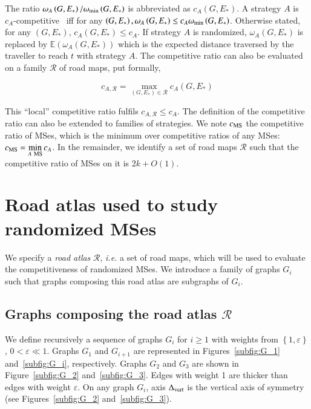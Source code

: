 \documentclass[preprint]{elsarticle}
\newcommand{\set}[1]{\left\{ #1 \right\}}
\newcommand{\omegamin}{\omega_{\mbox{\scriptsize{min}}}}
\newcommand{\mcalr}{\mathcal{R}}
\newcommand{\mts}{MS}
\newcommand{\deltavert}{\Delta_{\mbox{\scriptsize{vert}}}}
\newcommand{\cms}{c_{\mbox{\scriptsize{MS}}}}
\begin{document}
The ratio $\omega_A\left(G,E_*\right)/\omegamin\left(G,E_*\right)$ is abbreviated as $c_A\left(G,E_*\right)$. A strategy $A$ is $c_A$-competitive~\cite{BoEl98,XuHuSuZh09} iff for any $\left(G,E_*\right), \omega_A\left(G,E_*\right) \leq c_A \omegamin\left(G,E_*\right)$. Otherwise stated, for any $\left(G,E_*\right)$, $c_A\left(G,E_*\right) \leq c_A$. If strategy $A$ is randomized, $\omega_A\left(G,E_*\right)$ is replaced by $\mathbb{E}\left(\omega_A\left(G,E_*\right)\right)$ which is the expected distance traversed by the traveller to reach $t$ with strategy $A$. The competitive ratio can also be evaluated on a family $\mathcal{R}$ of road maps, put formally,

\begin{equation}
c_{A,\mathcal{R}} = \max\limits_{\left(G,E_*\right) \in \mathcal{R}} c_A\left(G,E_*\right)
\end{equation}

This ``local'' competitive ratio fulfils $c_{A,\mathcal{R}} \le c_A$. The definition of the competitive ratio can also be extended to families of strategies. We note $\cms$ the competitive ratio of \mts es, which is the minimum over competitive ratios of any \mts es: $\cms = \min\limits_{A ~\mbox{\scriptsize{\mts}}} c_A$. In the remainder, we identify a set of road maps $\mathcal{R}$ such that the competitive ratio of \mts es on it is $2k+O\left(1\right)$.

\section{Road atlas used to study randomized \mts es} \label{sec:roadatlas}

We specify a \textit{road atlas} $\mathcal{R}$, {\em i.e.} a set of road maps, which will be used to evaluate the competitiveness of randomized \mts es. We introduce a family of graphs $G_i$ such that graphs composing this road atlas are subgraphs of $G_i$. 

\subsection{Graphs composing the road atlas $\mcalr$} \label{subsec:Gi}

We define recursively a sequence of graphs $G_i$ for $i \geq 1$ with weights from $\set{1,\varepsilon}$, $0 < \varepsilon \ll 1$. Graphs $G_1$ and $G_{i+1}$ are represented in Figures~\ref{subfig:G_1} and~\ref{subfig:G_i}, respectively. Graphs $G_2$ and $G_3$ are shown in Figure~\ref{subfig:G_2} and~\ref{subfig:G_3}. Edges with weight 1 are thicker than edges with weight $\varepsilon$. On any graph $G_i$, axis $\deltavert$ is the vertical axis of symmetry (see Figures~\ref{subfig:G_2} and~\ref{subfig:G_3}).
\end{document}
